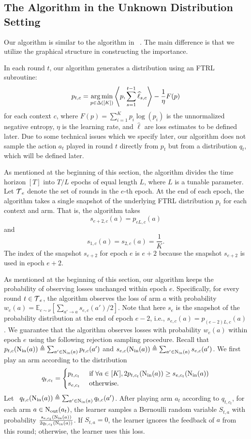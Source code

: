 \subsection{The Algorithm in the Unknown Distribution Setting}
Our algorithm is similar to the algorithm in ~\citet{Sch23}. The main difference is that we utilize the graphical structure in constructing the importance. 
%

In each round $t$, our algorithm generates a distribution using an FTRL subroutine: \[p_{t,c} = \operatorname*{arg\,min}_{p \in \Delta([K])} \left\langle p, \sum_{s=1}^{t-1} \widehat{\ell}_{s,c} \right\rangle - \frac{1}{\eta} F(p)\]
for each context $c$, where $F(p) = \sum_{i=1}^K p_i \log(p_i)$ is the unnormalized negative entropy, $\eta$ is the learning rate, and $\widehat{\ell}$ are loss estimates to be defined later.
%
Due to some technical issues which we specify later, our algorithm does not sample the action $a_t$ played in round $t$ directly from $p_t$ but from a distribution $q_t$, which will be defined later.

As mentioned at the beginning of this section, the algorithm divides the time horizon $[T]$ into $T/L$ epochs of equal length $L$, where $L$ is a tunable parameter. Let $\operatorname{\mathcal{T}}_e$ denote the set of rounds in the $e$-th epoch. At the end of each epoch, the algorithm takes a single snapshot of the underlying FTRL distribution $p_t$ for each context and arm. That is, the algorithm takes
\[s_{e+2,c}(a) = p_{eL,c}(a)\]
and
\[s_{1, c}(a) = s_{2, c}(a) = \frac{1}{K}.\]
The index of the snapshot $s_{e+2}$ for epoch $e$ is $e+2$ because the snapshot $s_{e+2}$ is used in epoch $e+2$.

As mentioned at the beginning of this section, our algorithm keeps the probability of observing losses unchanged within epoch $e$. 
%
Specifically, for every round $t \in \operatorname{\mathcal{T}}_e$, the algorithm observes the loss of arm $a$ with probability $w_e(a)=\mathbb{E}_{c \sim \nu}\left[ \sum_{a' \rightarrow a} s_{e,c}(a') / 2\right]$. Note that here $s_e$ is the snapshot of the probability distribution at the end of epoch $e-2$, i.e., $s_{e,c}(a) = p_{(e-2)L,c}(a)$.
%
We guarantee that the algorithm observes losses with probability $w_e(a)$ within epoch $e$ using the following rejection sampling procedure. Recall that $p_{t,c}(\operatorname{N_{\text{in}}}(a)) \triangleq \sum_{a' \in \operatorname{N_{\text{in}}}(a)} p_{t,c}(a')$ and $s_{e,c}(\operatorname{N_{\text{in}}}(a)) \triangleq \sum_{a' \in \operatorname{N_{\text{in}}}(a)} s_{e,c}(a')$. We first play an arm according to the distribution
\[
q_{t, c_t}= \begin{cases}p_{t, c_t} & \text { if } \forall a \in[K], 2 p_{t,c_t}(\operatorname{N_{\text{in}}}(a))  \geq s_{e, c_t}(\operatorname{N_{\text{in}}}(a))  \\ s_{e, c_t} & \text { otherwise.}\end{cases}
\]
Let ~$q_{t,c}(\operatorname{N_{\text{in}}}(a)) \triangleq \sum_{a' \in \operatorname{N_{\text{in}}}(a)} q_{t,c}(a')$. After playing arm $a_t$ according to $q_{t, c_t}$, for each arm $a \in \operatorname{N_{\text{out}}}(a_t)$, the learner samples a Bernoulli random variable $S_{t,a}$ with probability $\frac{s_{e,c_t}(\operatorname{N_{\text{in}}}(a))}{2 q_{t,c_t}(\operatorname{N_{\text{in}}}(a))}$. If $S_{t,a}=0$, the learner ignores the feedback of $a$ from this round; otherwise, the learner uses this loss. 

